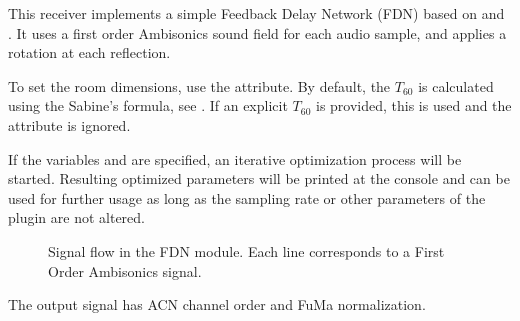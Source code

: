 This receiver implements a simple Feedback Delay Network (FDN) based
on \citet{Schroeder1962} and \citet{Rocchesso1997}. It uses a first
order Ambisonics sound field for each audio sample, and applies a
rotation at each reflection.

To set the room
dimensions, use the  attribute. By default, the
$T_{60}$ is calculated using the Sabine's formula, see
. If an explicit $T_{60}$ is provided, this is used
and the  attribute is ignored.

If the variables  and  are specified, an
iterative optimization process will be started. Resulting optimized
parameters will be printed at the console and can be used for further
usage as long as the sampling rate or other parameters of the plugin
are not altered.

\begin{figure}[htb]
\centering
{}
\caption{Signal flow in the FDN module. Each line corresponds to a First Order Ambisonics signal.}
\label{fig:fdn}
\end{figure}





The output signal has ACN channel order and FuMa normalization.
